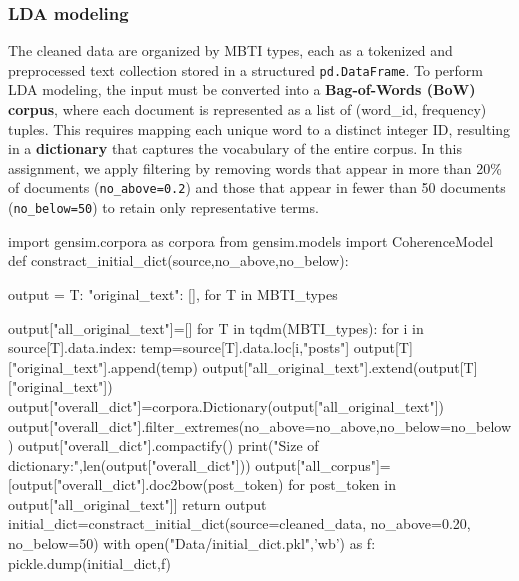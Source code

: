 \documentclass[12pt]{article}
\numberwithin{figure}{section}  %
\begin{document}
\subsubsection{LDA modeling}
	The cleaned data are organized by MBTI types, each as a tokenized and
	preprocessed text collection stored in a structured \texttt{pd.DataFrame}. 
	To perform LDA modeling, the input must be converted into a
	\textbf{Bag-of-Words (BoW) corpus}, where each document is represented as a
	list of (word\_id, frequency) tuples. This requires mapping each unique word
	to a distinct integer ID, resulting in a \textbf{dictionary} that captures
	the vocabulary of the entire corpus. In this assignment, we apply filtering
	by removing words that appear in more than 20\% of documents
	(\texttt{no\_above=0.2}) and those that appear in fewer than 50 documents
	(\texttt{no\_below=50}) to retain only representative terms.
	\begin{python}
import gensim.corpora as corpora
from gensim.models import CoherenceModel
def constract_initial_dict(source,no_above,no_below):

    output = {T: {
        "original_text": [],
    } for T in MBTI_types}
    
    output["all_original_text"]=[]
    for T in tqdm(MBTI_types):
        for i in source[T].data.index:
            temp=source[T].data.loc[i,"posts"]
            output[T]["original_text"].append(temp)
        output["all_original_text"].extend(output[T]["original_text"])
    output["overall_dict"]=corpora.Dictionary(output["all_original_text"])
    output["overall_dict"].filter_extremes(no_above=no_above,no_below=no_below)
    output["overall_dict"].compactify()
    print("Size of dictionary:",len(output["overall_dict"]))
    output["all_corpus"]=[output["overall_dict"].doc2bow(post_token) for post_token in output["all_original_text"]]
    return output
initial_dict=constract_initial_dict(source=cleaned_data,
                                    no_above=0.20,
                                    no_below=50)
with open("Data/initial_dict.pkl",'wb') as f:
    pickle.dump(initial_dict,f)
	\end{python}
	
\end{document}

